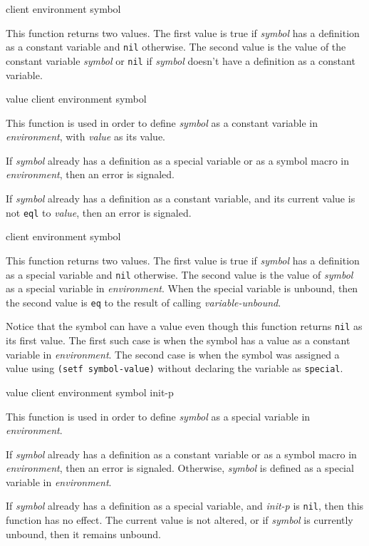  {client environment symbol}

This function returns two values. The first value is true if \textit{symbol}
has a definition as a constant variable and \texttt{nil} otherwise. The second
value is the value of the constant variable \textit{symbol} or \texttt{nil} if
\textit{symbol} doesn't have a definition as a constant variable.

 {value client environment symbol}

This function is used in order to define \textit{symbol} as a constant
variable in \textit{environment}, with \textit{value} as its value.

If \textit{symbol} already has a definition as a special variable or
as a symbol macro in \textit{environment}, then an error is signaled.

If \textit{symbol} already has a definition as a constant variable,
and its current value is not \texttt{eql} to \textit{value}, then an
error is signaled.

 {client environment symbol}

This function returns two values. The first value is true if \textit{symbol}
has a definition as a special variable and \texttt{nil} otherwise. The second
value is the value of \textit{symbol} as a special variable in
\textit{environment}. When the special variable is unbound, then the second
value is \texttt{eq} to the result of calling \textit{variable-unbound}.

Notice that the symbol can have a value even though this function returns
\texttt{nil} as its first value.  The first such case is when the symbol has a
value as a constant variable in \textit{environment}.  The second case is when
the symbol was assigned a value using \texttt{(setf symbol-value)} without
declaring the variable as \texttt{special}.

 {value client environment symbol init-p}

This function is used in order to define \textit{symbol} as a special
variable in \textit{environment}.

If \textit{symbol} already has a definition as a constant variable or
as a symbol macro in \textit{environment}, then an error is signaled.
Otherwise, \textit{symbol} is defined as a special variable in
\textit{environment}.

If \textit{symbol} already has a definition as a special variable, and
\textit{init-p} is \texttt{nil}, then this function has no effect.
The current value is not altered, or if \textit{symbol} is currently
unbound, then it remains unbound.

